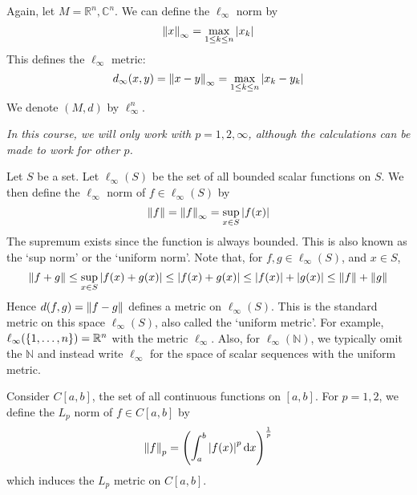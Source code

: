 \begin{example}
	Again, let \( M = \mathbb R^n, \mathbb C^n \).
	We can define the \( \ell_\infty \) norm by
	\[
		\norm{x}_\infty = \max_{1 \leq k \leq n} \abs{x_k}
	\]
	This defines the \( \ell_\infty \) metric:
	\[
		d_\infty(x,y) = \norm{x-y}_\infty = \max_{1 \leq k \leq n} \abs{x_k - y_k}
	\]
	We denote \( (M, d) \) by \( \ell_\infty^n \).
\end{example}
\noindent \textit{In this course, we will only work with \( p = 1, 2, \infty \), although the calculations can be made to work for other \( p \).}
\begin{example}
	Let \( S \) be a set.
	Let \( \ell_\infty(S) \) be the set of all bounded scalar functions on \( S \).
	We then define the \( \ell_\infty \) norm of \( f \in \ell_\infty(S) \) by
	\[
		\norm{f} = \norm{f}_\infty = \sup_{x \in S} \abs{f(x)}
	\]
	The supremum exists since the function is always bounded.
	This is also known as the `sup norm' or the `uniform norm'.
	Note that, for \( f,g \in \ell_\infty(S) \), and \( x \in S \),
	\[
		\norm{f+g} \leq \sup_{x \in S} \abs{f(x) + g(x)} \leq \abs{f(x) + g(x)} \leq \abs{f(x)} + \abs{g(x)} \leq \norm{f} + \norm{g}
	\]
	Hence \( d(f,g) =\norm{f-g} \) defines a metric on \( \ell_\infty(S) \).
	This is the standard metric on this space \( \ell_\infty(S) \), also called the `uniform metric'.
	For example, \( \ell_\infty(\qty{1, \dots, n}) = \mathbb R^n \) with the metric \( \ell_\infty \).
	Also, for \( \ell_\infty(\mathbb N) \), we typically omit the \( \mathbb N \) and instead write \( \ell_\infty \) for the space of scalar sequences with the uniform metric.
\end{example}
\begin{example}
	Consider \( C[a,b] \), the set of all continuous functions on \( [a,b] \).
	For \( p = 1,2 \), we define the \( L_p \) norm of \( f \in C[a,b] \) by
	\[
		\norm{f}_p = \qty( \int_a^b \abs{f(x)}^p \dd{x} )^{\frac{1}{p}}
	\]
	which induces the \( L_p \) metric on \( C[a,b] \).
\end{example}
